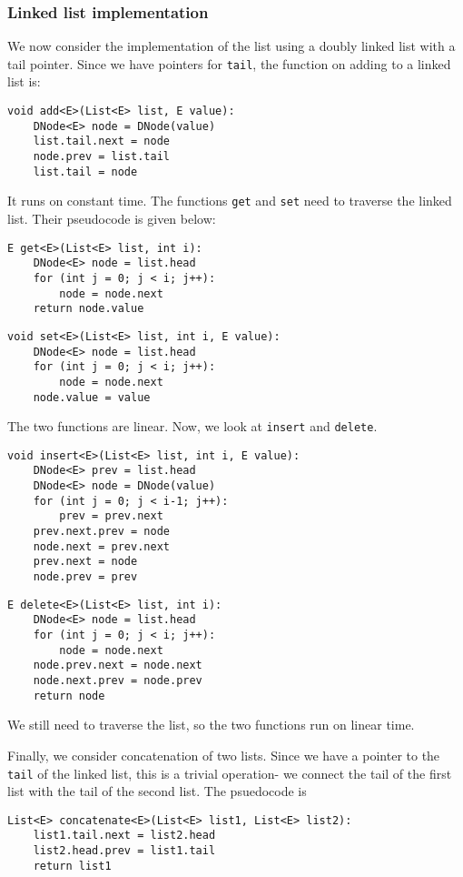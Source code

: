 \documentclass[a4paper, openany]{memoir}
\begin{document}
\subsubsection{Linked list implementation}
We now consider the implementation of the list using a doubly linked list with a tail pointer. Since we have pointers for \texttt{tail}, the function on adding to a linked list is:
\begin{lstlisting}[language=pseudocode]
void add<E>(List<E> list, E value):
    DNode<E> node = DNode(value)
    list.tail.next = node
    node.prev = list.tail
    list.tail = node
\end{lstlisting}
It runs on constant time. The functions \texttt{get} and \texttt{set} need to traverse the linked list. Their pseudocode is given below:
\begin{lstlisting}[language=pseudocode]
E get<E>(List<E> list, int i):
    DNode<E> node = list.head
    for (int j = 0; j < i; j++):
        node = node.next
    return node.value
\end{lstlisting}

\begin{lstlisting}[language=pseudocode]
void set<E>(List<E> list, int i, E value):
    DNode<E> node = list.head
    for (int j = 0; j < i; j++):
        node = node.next
    node.value = value
\end{lstlisting}
The two functions are linear. Now, we look at \texttt{insert} and \texttt{delete}. 
\begin{lstlisting}[language=pseudocode]
void insert<E>(List<E> list, int i, E value):
    DNode<E> prev = list.head
    DNode<E> node = DNode(value)
    for (int j = 0; j < i-1; j++):
        prev = prev.next
    prev.next.prev = node
    node.next = prev.next
    prev.next = node
    node.prev = prev
\end{lstlisting}
\begin{lstlisting}[language=pseudocode]
E delete<E>(List<E> list, int i):
    DNode<E> node = list.head
    for (int j = 0; j < i; j++):
        node = node.next
    node.prev.next = node.next
    node.next.prev = node.prev
    return node
\end{lstlisting}
We still need to traverse the list, so the two functions run on linear time.

\noindent Finally, we consider concatenation of two lists. Since we have a pointer to the \texttt{tail} of the linked list, this is a trivial operation- we connect the tail of the first list with the tail of the second list. The psuedocode is
\begin{lstlisting}[language=pseudocode]
List<E> concatenate<E>(List<E> list1, List<E> list2):
    list1.tail.next = list2.head
    list2.head.prev = list1.tail
    return list1
\end{lstlisting}
\newpage
\end{document}
